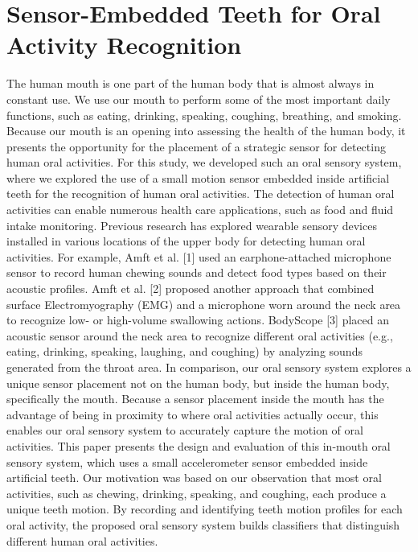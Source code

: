 \chapter{Sensor-Embedded Teeth for Oral Activity Recognition}

The human mouth is one part of the human body that is almost always in constant use. We use our mouth to perform some of the most important daily functions, such as eating, drinking, speaking, coughing, breathing, and smoking. Because our mouth is an opening into assessing the health of the human body, it presents the opportunity for the placement of a strategic sensor for detecting human oral activities. For this study, we developed such an oral sensory system, where we explored the use of a small motion sensor embedded inside artificial teeth for the recognition of human oral activities. The detection of human oral activities can enable numerous health care applications, such as food and fluid intake monitoring.   
Previous research has explored wearable sensory devices installed in various locations of the upper body for detecting human oral activities. For example, Amft et al. [1] used an earphone-attached microphone sensor to record human chewing sounds and detect food types based on their acoustic profiles. Amft et al. [2] proposed another approach that combined surface Electromyography (EMG) and a microphone worn around the neck area to recognize low- or high-volume swallowing actions. BodyScope [3] placed an acoustic sensor around the neck area to recognize different oral activities (e.g., eating, drinking, speaking, laughing, and coughing) by analyzing sounds generated from the throat area. In comparison, our oral sensory system explores a unique sensor placement not on the human body, but inside the human body, specifically the mouth. Because a sensor placement inside the mouth has the advantage of being in proximity to where oral activities actually occur, this enables our oral sensory system to accurately capture the motion of oral activities. 
This paper presents the design and evaluation of this in-mouth oral sensory system, which uses a small accelerometer sensor embedded inside artificial teeth. Our motivation was based on our observation that most oral activities, such as chewing, drinking, speaking, and coughing, each produce a unique teeth motion. By recording and identifying teeth motion profiles for each oral activity, the proposed oral sensory system builds classifiers that distinguish different human oral activities. 

